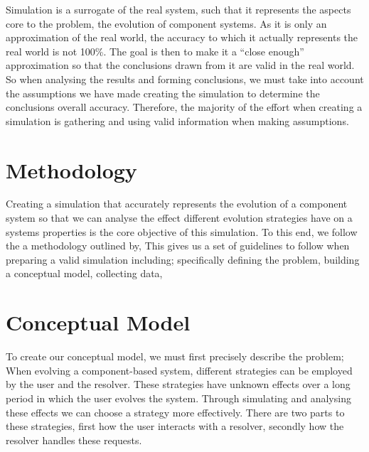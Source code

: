 Simulation is a surrogate of the real system, such that it represents the aspects core to the problem, 
the evolution of component systems.
As it is only an approximation of the real world, 
the accuracy to which it actually represents the real world is not 100\%.
The goal is then to make it a ``close enough'' approximation so that the conclusions drawn from it are valid in the real world.
So when analysing the results and forming conclusions, we must take into account the assumptions we have made creating the simulation to determine 
the conclusions overall accuracy.
Therefore, the majority of the effort when creating a simulation is gathering and using valid information when making assumptions.

\section{Methodology}
Creating a simulation that accurately represents the evolution of a component system so that we can 
analyse the effect different evolution strategies have on a systems properties is the core objective of this simulation.
To this end, we follow the a methodology outlined by, %
This gives us a set of guidelines to follow when preparing a valid simulation including;
specifically defining the problem,
building a conceptual model,
collecting data,

\section{Conceptual Model}
To create our conceptual model, we must first precisely describe the problem;
{}When evolving a component-based system, different strategies can be employed by the user and the resolver.
{}These strategies have unknown effects over a long period in which the user evolves the system.
{}Through simulating and analysing these effects we can choose a strategy more effectively.
{}There are two parts to these strategies, first how the user interacts with a resolver, secondly how the resolver handles these requests.

